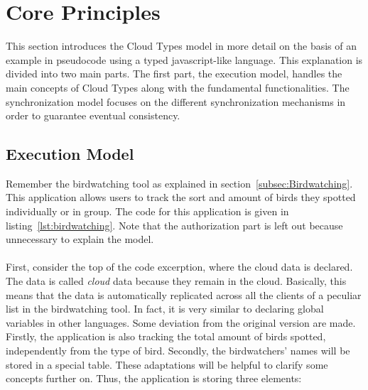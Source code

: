 \documentclass[a4paper,12pt]{report}
\begin{document}
\section{Core Principles}\label{sec:CorePrinciples}

This section introduces the Cloud Types model in more detail on the basis of an example in pseudocode using a typed javascript-like language. This explanation is divided into two main parts. The first part, the execution model, handles the main concepts of Cloud Types along with the fundamental functionalities. The synchronization model focuses on the different synchronization mechanisms in order to guarantee eventual consistency.

\begin{figure}
\begin{minipage}[t]{\textwidth}
\vspace{-3cm}

\end{minipage}
\end{figure}

\subsection{Execution Model}\label{subsec:ExecutionModel}

Remember the birdwatching tool as explained in section~\ref{subsec:Birdwatching}. This application allows users to track the sort and amount of birds they spotted individually or in group. The code for this application is given in listing~\ref{lst:birdwatching}. Note that the authorization part is left out because unnecessary to explain the model. \\
\\
First, consider the top of the code excerption, where the cloud data is declared. The data is called \textit{cloud} data because they remain in the cloud. Basically, this means that the data is automatically replicated across all the clients of a peculiar list in the birdwatching tool. In fact, it is very similar to declaring global variables in other languages. Some deviation from the original version are made. Firstly, the application is also tracking the total amount of birds spotted, independently from the type of bird. Secondly, the birdwatchers' names will be stored in a special table. These adaptations will be helpful to clarify some concepts further on. Thus, the application is storing three elements:
\end{document}
